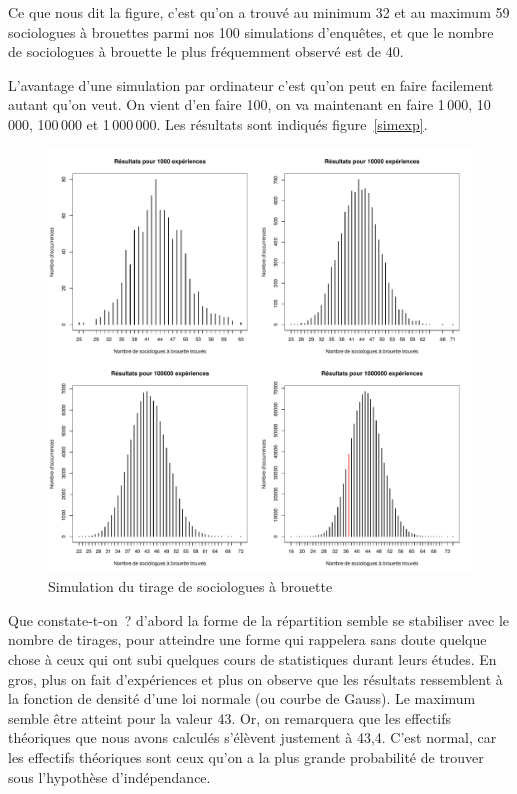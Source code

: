 \documentclass[a4paper,10pt,twoside,francais]{report}
\begin{document}
Ce que nous dit la figure, c'est qu'on a trouvé au minimum 32
et au maximum 59 sociologues à brouettes parmi nos 100 simulations
d'enquêtes, et que le nombre de sociologues à brouette le plus
fréquemment observé est de 40.

L'avantage d'une simulation par ordinateur c'est qu'on peut en faire
facilement autant qu'on veut. On vient d'en faire 100, on va
maintenant en faire 1\,000, 10\,000, 100\,000 et 1\,000\,000. Les
résultats sont indiqués figure~\vref{simexp}.

\begin{figure}
  \begin{center}
    \includegraphics[width=15cm]{images/exp1000_10000_100000.pdf}
  \end{center}
  \caption{Simulation du tirage de sociologues à brouette}
  \label{simexp}
\end{figure}

Que constate-t-on~? d'abord la forme de la répartition semble se
stabiliser avec le nombre de tirages, pour atteindre une forme qui
rappelera sans doute quelque chose à ceux qui ont subi quelques cours
de statistiques durant leurs études. En gros, plus on fait
d'expériences et plus on observe que les résultats ressemblent à la
fonction de densité d'une loi normale (ou courbe de Gauss). Le maximum
semble être atteint pour la valeur 43. Or, on remarquera que les
effectifs théoriques que nous avons calculés s'élèvent justement à
43,4. C'est normal, car les effectifs théoriques sont ceux qu'on a la
plus grande probabilité de trouver sous l'hypothèse d'indépendance.
\end{document}
